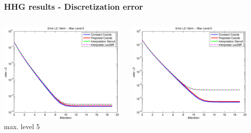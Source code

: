 \documentclass[t,compress=false,usepdftitle=false]{beamer}
\begin{document}
%
%
\begin{frame}\frametitle{HHG results - Discretization error}

\begin{columns}[T] 
\begin{column}[T]{4.3cm} 
  \centering
  \includegraphics[width=0.98\textwidth]{spherepoisson_errorEuc_level5}\\
  max. level 5
\end{column}\hfill
\begin{column}[T]{4.3cm} 
  \centering
  \includegraphics[width=0.98\textwidth]{spherepoisson_errorEuc_level6}\\

\end{column}
\end{columns}
\end{frame}
\end{document}

